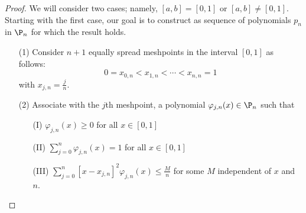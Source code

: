 \begin{proof}
    We will consider two cases; namely, \( [a,b] = [0,1] \) or \( [a,b] \neq [0,1] \). Starting with the first case, our goal is to construct as sequence of polynomials \( {p}_{n} \) in \( {\P}_{n} \) for which the result holds. 
    \begin{enumerate}
        \item[(1)] Consider \( n + 1  \) equally spread meshpoints in the interval \( [0,1] \) as follows:
            \[  0  = {x}_{0,n} < {x}_{1,n} < \cdots < {x}_{n,n} = 1  \]
            with \( {x}_{j,n} = \frac{ j  }{ n }  \).
        \item[(2)] Associate with the \( j \)th meshpoint, a polynomial \( \varphi_{j,n}(x) \in {\P}_{n} \) such that 
            \begin{enumerate}
                \item[(I)] \( {\varphi}_{j,n}(x) \geq 0  \) for all \( x \in [0,1] \) 
                \item[(II)] \( \displaystyle \sum_{ j = 0  }^{ n } {\varphi}_{j,n}(x) = 1  \) for all \( x \in [0,1] \)
                \item[(III)] \( \displaystyle \sum_{ j=0  }^{ n } [x - {x}_{j,n}]^{2} {\varphi}_{j,n}(x) \leq \displaystyle \frac{ M }{ n } \) for some \( M  \) independent of \( x  \) and \( n  \).
            \end{enumerate}
    \end{enumerate}
\end{proof}

